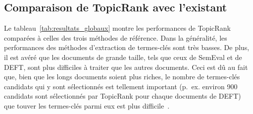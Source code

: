   \subsection{Comparaison de TopicRank avec l'existant}
  \label{subsec:comparaison_de_topicrank_avec_l_existant}
    Le tableau~\ref{tab:resultats_globaux} montre les performances de TopicRank
    comparées à celles des trois méthodes de référence. Dans la généralité, les
    performances des méthodes d'extraction de termes-clés sont très basses. De
    plus, il est avéré que les documents de grande taille, tels que ceux de
    SemEval et de DEFT, sont plus difficiles à traiter que les autres documents.
    Ceci est dû au fait que, bien que les longs documents soient plus riches, le
    nombre de termes-clés candidats qui y sont sélectionnés est tellement
    important (p.~ex. environ 900 candidats sont sélectionnés par TopicRank pour
    chaque documents de DEFT) que touver les termes-clés parmi eux est plus
    difficile~\cite{hasan2014state_of_the_art}.

